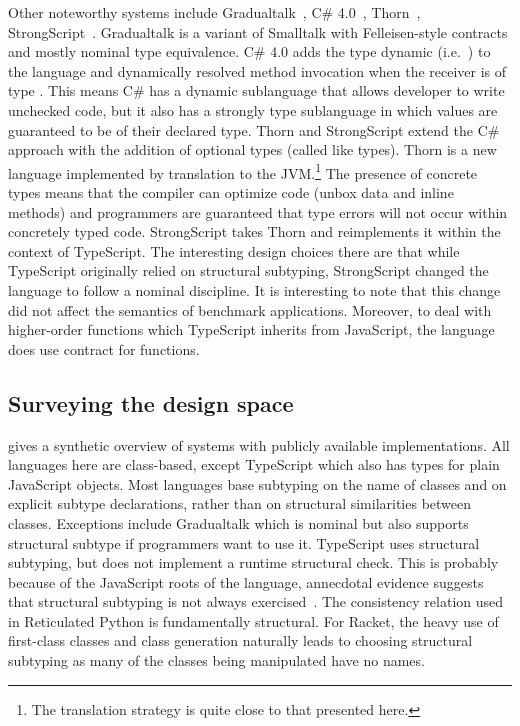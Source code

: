 \documentclass[a4paper,USenglish]{tex/lipics-v2016}
\begin{document}
Other noteworthy systems include Gradualtalk~\cite{GS13}, C\#
4.0~\cite{Bierman10}, Thorn~\cite{oopsla09},
StrongScript~\cite{ecoop15}. Gradualtalk is a variant of Smalltalk with
Felleisen-style contracts and mostly nominal type equivalence. C\# 4.0 adds
the type {\sf dynamic} (i.e.~\any) to the language and dynamically resolved
method invocation when the receiver is of type \any.  This means C\# has a
dynamic sublanguage that allows developer to write unchecked code, but it
also has a strongly type sublanguage in which values are guaranteed to be of
their declared type.  Thorn and StrongScript extend the C\# approach with
the addition of optional types (called like types).  Thorn is a new language
implemented by translation to the JVM.\footnote{The translation strategy is
  quite close to that presented here.} The presence of concrete types means
that the compiler can optimize code (unbox data and inline methods) and
programmers are guaranteed that type errors will not occur within concretely
typed code.  StrongScript takes Thorn and reimplements it within the context
of TypeScript.  The interesting design choices there are that while
TypeScript originally relied on structural subtyping, StrongScript changed
the language to follow a nominal discipline. It is interesting to note that
this change did not affect the semantics of benchmark
applications. Moreover, to deal with higher-order functions which TypeScript
inherits from JavaScript, the language does use contract for functions.


\subsection{Surveying the design space}

 gives a synthetic overview of systems with publicly available
implementations. All languages here are class-based, except TypeScript which
also has types for plain JavaScript objects. Most languages base subtyping
on the name of classes and on explicit subtype declarations, rather than on
structural similarities between classes.  Exceptions include Gradualtalk
which is nominal but also supports structural subtype if programmers want to
use it.  TypeScript uses structural subtyping, but does not implement a
runtime structural check. This is probably because of the JavaScript roots
of the language, annecdotal evidence suggests that structural subtyping is
not always exercised~\cite{ecoop15}.  The consistency relation used in
Reticulated Python is fundamentally structural.  For Racket, the heavy use
of first-class classes and class generation naturally leads to choosing
structural subtyping as many of the classes being manipulated have no names.
\end{document}
